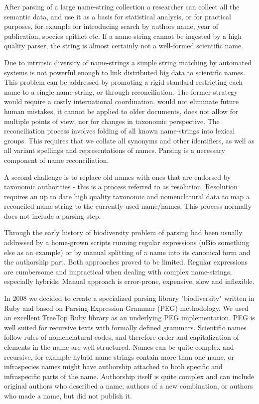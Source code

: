 \documentclass{bmcart}
\begin{document}
After parsing of a large name-string collection a researcher can collect all
the semantic data, and use it as a basis for statistical analysis, or for
practical purposes, for example for introducing search by authors name, year of
publication, species epithet etc. If a name-string cannot be ingested by a high
quality parser, the string is almost certainly not a well-formed scientific
name.

Due to intrinsic diversity of name-strings a simple string matching by
automated systems is not powerful enough to link distributed big data to
scientific names. This problem can be addressed by promoting a rigid standard
restricting each name to a single name-string, or through reconciliation. The
former strategy would require a costly international coordination, would not
eliminate future human mistakes, it cannot be applied to older documents, does
not allow for multiple points of view, nor for changes in taxonomic
perspective.  The reconciliation process involves folding of all known
name-strings into lexical groups.  This requires that we collate all synonyms
and other identifiers, as well as all variant spellings and representations of
names. Parsing is a necessary component of name reconciliation.

A second challenge is to replace old names with ones that are endorsed by
taxonomic authorities - this is a process referred to as resolution. Resolution
requires an up to date high quality taxonomic and nomenclatural data to map a
reconciled name-string to the currently used name/names. This process normally
does not include a parsing step.

Through the early history of biodiversity problem of parsing had been usually
addressed by a home-grown scripts running regular expressions (uBio something
else as an example) or by manual splitting of a name into its canonical form
and the authorship part. Both approaches proved to be limited. Regular
expressions are cumbersome and impractical when dealing with complex
name-strings, especially hybrids. Manual approach is error-prone, expensive,
slow and inflexible.

In 2008 we decided to create a specialized parsing library "biodiversity"
written in Ruby and based on Parsing Expression Grammar (PEG) methodology. We
used an excellent TreeTop Ruby library as an underlying PEG implementation. PEG
is well suited for recursive texts with formally defined grammars. Scientific
names follow rules of nomenclatural codes, and therefore order and
capitalization of elements in the name are well structured. Names can be quite
complex and recursive, for example hybrid name strings contain more than one
name, or infraspecies names might have authorship attached to both specific and
infraspecific parts of the name. Authorship itself is quite complex and can
include original authors who described a name, authors of a new combination, or
authors who made a name, but did not publish it.
\end{document}
